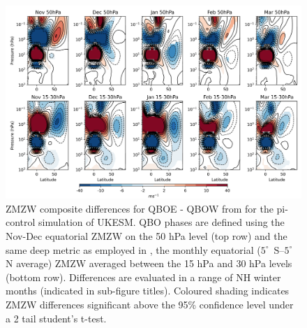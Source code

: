 \begin{figure}[h!]
\begin{center}
\noindent\includegraphics[width = \linewidth]{Figures/Figures-deepQBO/LAGGED_ZMZW_composites_by_month_QBO_phases_U_picontrol_MarQBO_vs_Mar_deephPa_5thresh.png}
\caption[ZMZW composites under different QBO phases in the pi-control simulation]{ZMZW composite differences for QBOE - QBOW from for the pi-control simulation of UKESM. QBO phases are defined using the Nov-Dec equatorial ZMZW on the 50 hPa level (top row) and the same deep metric as employed in \cite{andrewsObserved2019d}, the monthly equatorial ($5^{\circ}$\ S--$5^{\circ}\ $N average) ZMZW averaged between the 15 hPa and 30 hPa levels (bottom row). Differences are evaluated in a range of NH winter months (indicated in sub-figure titles). Coloured shading indicates ZMZW differences significant above the 95\% confidence level under a 2 tail student’s t-test.}
\label{fig:HT_picontrol}
\end{center}
\end{figure}

